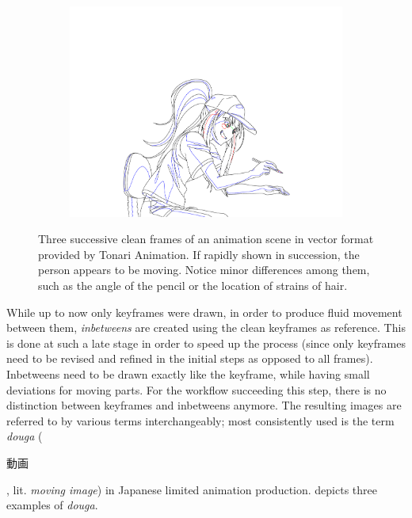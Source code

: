 \begin{figure}[h]
\begin{subfigure}[b]{0.3\textwidth}
    \end{subfigure}
    \begin{subfigure}[b]{0.3\textwidth}
    \includegraphics[width=\textwidth]{graphics/douga/007AD_DOU_28.pdf}
    \end{subfigure}
\caption{Three successive clean frames of an animation scene in vector format provided by Tonari Animation. If rapidly shown in succession, the person appears to be moving. Notice minor differences among them, such as the angle of the pencil or the location of strains of hair.}
\label{fig:multiple-douga}
\end{figure}

While up to now only keyframes were drawn, in order to produce fluid movement between them, \emph{inbetweens} are created using the clean keyframes as reference. This is done at such a late stage in order to speed up the process (since only keyframes need to be revised and refined in the initial steps as opposed to all frames). Inbetweens need to be drawn exactly like the keyframe, while having small deviations for moving parts. For the workflow succeeding this step, there is no distinction between keyframes and inbetweens anymore. The resulting images are referred to by various terms interchangeably; most consistently used is the term \emph{douga} (\begin{CJK}{UTF8}{min}動画\end{CJK}, lit. \emph{moving image}) in Japanese limited animation production.  depicts three examples of \emph{douga}.

